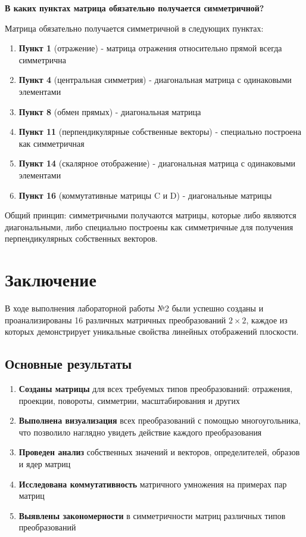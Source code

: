 \textbf{В каких пунктах матрица обязательно получается симметричной?}

Матрица обязательно получается симметричной в следующих пунктах:

\begin{enumerate}
\item \textbf{Пункт 1} (отражение) - матрица отражения относительно прямой всегда симметрична
\item \textbf{Пункт 4} (центральная симметрия) - диагональная матрица с одинаковыми элементами
\item \textbf{Пункт 8} (обмен прямых) - диагональная матрица
\item \textbf{Пункт 11} (перпендикулярные собственные векторы) - специально построена как симметричная
\item \textbf{Пункт 14} (скалярное отображение) - диагональная матрица с одинаковыми элементами
\item \textbf{Пункт 16} (коммутативные матрицы C и D) - диагональные матрицы
\end{enumerate}

Общий принцип: симметричными получаются матрицы, которые либо являются диагональными, либо специально построены как симметричные для получения перпендикулярных собственных векторов.

\section*{Заключение}

В ходе выполнения лабораторной работы №2 были успешно созданы и проанализированы 16 различных матричных преобразований $2 \times 2$, каждое из которых демонстрирует уникальные свойства линейных отображений плоскости.

\subsection*{Основные результаты}

\begin{enumerate}
\item \textbf{Созданы матрицы} для всех требуемых типов преобразований: отражения, проекции, повороты, симметрии, масштабирования и других
\item \textbf{Выполнена визуализация} всех преобразований с помощью многоугольника, что позволило наглядно увидеть действие каждого преобразования
\item \textbf{Проведен анализ} собственных значений и векторов, определителей, образов и ядер матриц
\item \textbf{Исследована коммутативность} матричного умножения на примерах пар матриц
\item \textbf{Выявлены закономерности} в симметричности матриц различных типов преобразований
\end{enumerate}

